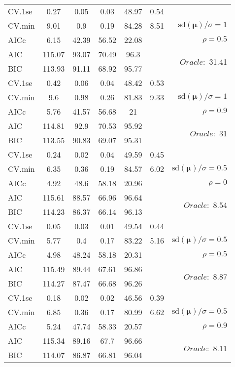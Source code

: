 \begin{table}
\begin{center}
\begin{tabular}{l*{5}{c}|r}
 \hline 
CV.1se & 0.27 & 0.05 & 0.03 & 48.97 & 0.54 & \\
CV.min & 9.01 & 0.9 & 0.19 & 84.28 & 8.51 &  $\mathrm{sd}(\mathbf{\mu})/\sigma=1$ \\
AICc & 6.15 & 42.39 & 56.52 & 22.08 & & $\rho=0.5$ \\
AIC & 115.07 & 93.07 & 70.49 & 96.3 & &  \multirow{2}{*}{$Oracle: $ 31.41} \\
BIC & 113.93 & 91.11 & 68.92 & 95.77 & &  \\
 \hline 
CV.1se & 0.42 & 0.06 & 0.04 & 48.42 & 0.53 & \\
CV.min & 9.6 & 0.98 & 0.26 & 81.83 & 9.33 &  $\mathrm{sd}(\mathbf{\mu})/\sigma=1$ \\
AICc & 5.76 & 41.57 & 56.68 & 21 & & $\rho=0.9$ \\
AIC & 114.81 & 92.9 & 70.53 & 95.92 & &  \multirow{2}{*}{$Oracle: $ 31} \\
BIC & 113.55 & 90.83 & 69.07 & 95.31 & &  \\
 \hline 
CV.1se & 0.24 & 0.02 & 0.04 & 49.59 & 0.45 & \\
CV.min & 6.35 & 0.36 & 0.19 & 84.57 & 6.02 &  $\mathrm{sd}(\mathbf{\mu})/\sigma=0.5$ \\
AICc & 4.92 & 48.6 & 58.18 & 20.96 & & $\rho=0$ \\
AIC & 115.61 & 88.57 & 66.96 & 96.64 & &  \multirow{2}{*}{$Oracle: $ 8.54} \\
BIC & 114.23 & 86.37 & 66.14 & 96.13 & &  \\
 \hline 
CV.1se & 0.05 & 0.03 & 0.01 & 49.54 & 0.44 & \\
CV.min & 5.77 & 0.4 & 0.17 & 83.22 & 5.16 &  $\mathrm{sd}(\mathbf{\mu})/\sigma=0.5$ \\
AICc & 4.98 & 48.24 & 58.18 & 20.31 & & $\rho=0.5$ \\
AIC & 115.49 & 89.44 & 67.61 & 96.86 & &  \multirow{2}{*}{$Oracle: $ 8.87} \\
BIC & 114.27 & 87.47 & 66.68 & 96.26 & &  \\
 \hline 
CV.1se & 0.18 & 0.02 & 0.02 & 46.56 & 0.39 & \\
CV.min & 6.85 & 0.36 & 0.17 & 80.99 & 6.62 &  $\mathrm{sd}(\mathbf{\mu})/\sigma=0.5$ \\
AICc & 5.24 & 47.74 & 58.33 & 20.57 & & $\rho=0.9$ \\
AIC & 115.34 & 89.16 & 67.7 & 96.66 & &  \multirow{2}{*}{$Oracle: $ 8.11} \\
BIC & 114.07 & 86.87 & 66.81 & 96.04 & &  \\
 \hline 
\end{tabular}
\end{center}
\vspace{-1cm}
\end{table}




